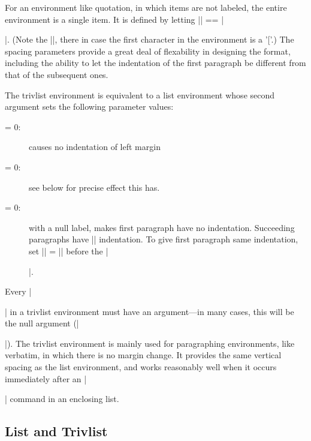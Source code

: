  For an environment like quotation, in which items are not labeled,
 the entire environment is a single item.  It is defined by
 letting |\quotation| == |\item\relax|.  (Note the
 |\relax|, there in case the first character in the environment is a
 '['.)  The spacing parameters provide a great deal of flexability in
 designing the format, including the ability to let the indentation of
 the first paragraph be different from that of the subsequent ones.

 The trivlist environment is equivalent to a list environment
 whose second argument sets the following parameter values:
 \begin{description}
 \item[ = 0:] causes no indentation of left margin
 \item[ = 0:] see below for precise effect this has.
 \item[ = 0:] with a null label, makes first paragraph
        have no indentation.  Succeeding paragraphs have |\parindent|
        indentation.  To give first paragraph same indentation, set
        |\itemindent| = |\parindent| before the |\item[]|.
 \end{description}

 Every |\item| in a trivlist environment must have an argument---in
 many cases, this will be the null argument (|\item[]|).  The trivlist
 environment is mainly used for paragraphing environments, like
 verbatim, in which there is no margin change.  It provides the same
 vertical spacing as the list environment, and works reasonably well
 when it occurs immediately after an |\item| command in an enclosing
 list.



 \subsection{List and Trivlist}


